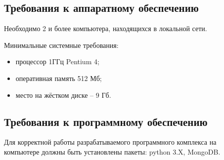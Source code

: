 \subsection {Требования к аппаратному обеспечению}

Необходимо 2 и более компьютера, находящихся в локальной сети.

Минимальные системные требования:

\begin{itemize}
\item процессор 1ГГц Pentium 4;
\item оперативная память 512 Мб;
\item место на жёстком диске -- 9 Гб.
\end{itemize}

\subsection {Требования к программному обеспечению}
Для корректной работы разрабатываемого программного комплекса на компьютере должны быть установлены пакеты: python 3.X, MongoDB. 
